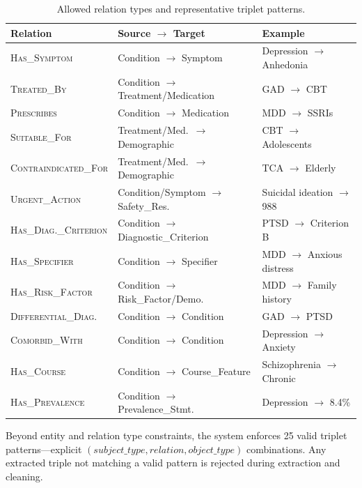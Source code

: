 \documentclass[12pt,a4paper]{article}
\begin{document}
\begin{table}[ht]
\centering
\caption{Allowed relation types and representative triplet patterns.}
\label{tab:relation_types}
\begin{tabular}{@{}lll@{}}
\toprule
\textbf{Relation} & \textbf{Source $\rightarrow$ Target} & \textbf{Example} \\
\midrule
\textsc{Has\_Symptom} & Condition $\rightarrow$ Symptom & Depression $\rightarrow$ Anhedonia \\
\textsc{Treated\_By} & Condition $\rightarrow$ Treatment/Medication & GAD $\rightarrow$ CBT \\
\textsc{Prescribes} & Condition $\rightarrow$ Medication & MDD $\rightarrow$ SSRIs \\
\textsc{Suitable\_For} & Treatment/Med.\ $\rightarrow$ Demographic & CBT $\rightarrow$ Adolescents \\
\textsc{Contraindicated\_For} & Treatment/Med.\ $\rightarrow$ Demographic & TCA $\rightarrow$ Elderly \\
\textsc{Urgent\_Action} & Condition/Symptom $\rightarrow$ Safety\_Res.\ & Suicidal ideation $\rightarrow$ 988 \\
\textsc{Has\_Diag.\_Criterion} & Condition $\rightarrow$ Diagnostic\_Criterion & PTSD $\rightarrow$ Criterion B \\
\textsc{Has\_Specifier} & Condition $\rightarrow$ Specifier & MDD $\rightarrow$ Anxious distress \\
\textsc{Has\_Risk\_Factor} & Condition $\rightarrow$ Risk\_Factor/Demo.\ & MDD $\rightarrow$ Family history \\
\textsc{Differential\_Diag.} & Condition $\rightarrow$ Condition & GAD $\rightarrow$ PTSD \\
\textsc{Comorbid\_With} & Condition $\rightarrow$ Condition & Depression $\rightarrow$ Anxiety \\
\textsc{Has\_Course} & Condition $\rightarrow$ Course\_Feature & Schizophrenia $\rightarrow$ Chronic \\
\textsc{Has\_Prevalence} & Condition $\rightarrow$ Prevalence\_Stmt.\ & Depression $\rightarrow$ 8.4\% \\
\bottomrule
\end{tabular}
\end{table}

Beyond entity and relation type constraints, the system enforces 25 valid triplet patterns---explicit $(subject\_type, relation, object\_type)$ combinations. Any extracted triple not matching a valid pattern is rejected during extraction and cleaning.
\end{document}
